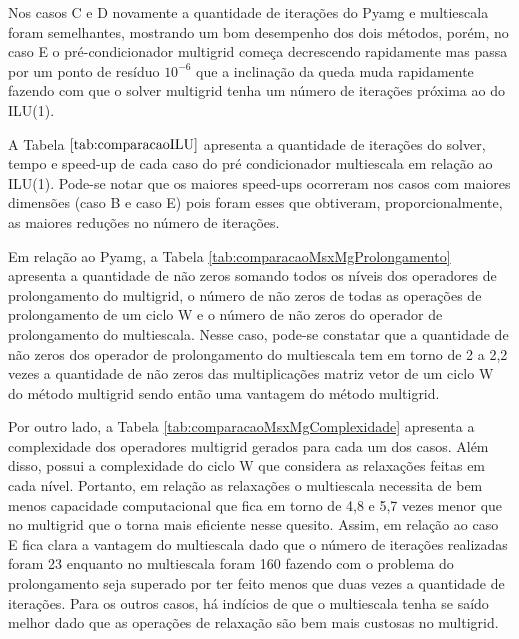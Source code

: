 Nos casos C e D novamente a quantidade de iterações do Pyamg e multiescala foram semelhantes, mostrando um bom desempenho dos dois métodos, porém, no caso E o pré-condicionador multigrid começa decrescendo rapidamente mas passa por um ponto de resíduo $10^{-6}$ que a inclinação da queda muda rapidamente fazendo com que o solver multigrid tenha um número de iterações próxima ao do ILU(1). 


A Tabela $\ref{tab:comparacaoILU}$ apresenta a quantidade de iterações do solver, tempo e speed-up de cada caso do pré condicionador multiescala em relação ao ILU(1). Pode-se notar que os maiores speed-ups ocorreram nos casos com maiores dimensões (caso B e caso E) pois foram esses que obtiveram, proporcionalmente, as maiores reduções no número de iterações.

Em relação ao Pyamg, a Tabela \ref{tab:comparacaoMsxMgProlongamento} apresenta a quantidade de não zeros somando todos os níveis dos operadores de prolongamento do multigrid, o número de não zeros de todas as operações de prolongamento de um ciclo W e o número de não zeros do operador de prolongamento do multiescala. Nesse caso, pode-se constatar que a quantidade de não zeros dos operador de prolongamento do multiescala tem em torno de 2 a 2,2 vezes a quantidade de não zeros das multiplicações matriz vetor de um ciclo W do método multigrid sendo então uma vantagem do método multigrid.

Por outro lado, a Tabela \ref{tab:comparacaoMsxMgComplexidade} apresenta a complexidade dos operadores multigrid gerados para cada um dos casos. Além disso, possui a complexidade do ciclo W que considera as relaxações feitas em cada nível. Portanto, em relação as relaxações o multiescala necessita de bem menos capacidade computacional que fica em torno de 4,8 e 5,7 vezes menor que no multigrid que o torna mais eficiente nesse quesito. 
Assim, em relação ao caso E fica clara a vantagem do multiescala dado que o número de iterações realizadas foram 23 enquanto no multiescala foram 160 fazendo com o problema do prolongamento seja superado por ter feito menos que duas vezes a quantidade de iterações. Para os outros casos, há indícios de que o multiescala tenha se saído melhor dado que as operações de relaxação são bem mais custosas no multigrid.

